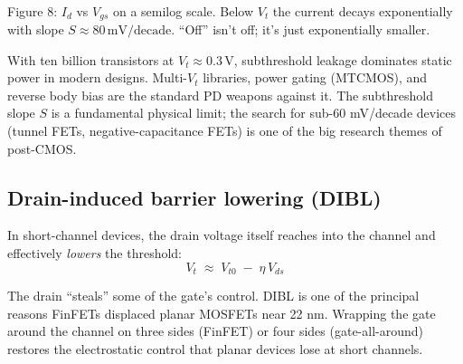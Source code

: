 \documentclass[11pt]{article}
\begin{document}
\begin{center}
\\
{\small Figure 8: $I_d$ vs $V_{gs}$ on a semilog scale. Below $V_t$ the current decays exponentially with slope $S \approx 80\,\text{mV/decade}$. ``Off'' isn't off; it's just exponentially smaller.}
\end{center}

\begin{pdnote}
With ten billion transistors at $V_t \approx 0.3\,\text{V}$, subthreshold leakage dominates static power in modern designs. Multi-$V_t$ libraries, power gating (MTCMOS), and reverse body bias are the standard PD weapons against it. The subthreshold slope $S$ is a fundamental physical limit; the search for sub-60 mV/decade devices (tunnel FETs, negative-capacitance FETs) is one of the big research themes of post-CMOS.
\end{pdnote}

\subsection{Drain-induced barrier lowering (DIBL)}

In short-channel devices, the drain voltage itself reaches into the channel and effectively \emph{lowers} the threshold:
\begin{equation}
V_t \;\approx\; V_{t0} \;-\; \eta\,V_{ds}
\end{equation}

The drain ``steals'' some of the gate's control. DIBL is one of the principal reasons FinFETs displaced planar MOSFETs near 22 nm. Wrapping the gate around the channel on three sides (FinFET) or four sides (gate-all-around) restores the electrostatic control that planar devices lose at short channels.
\end{document}
